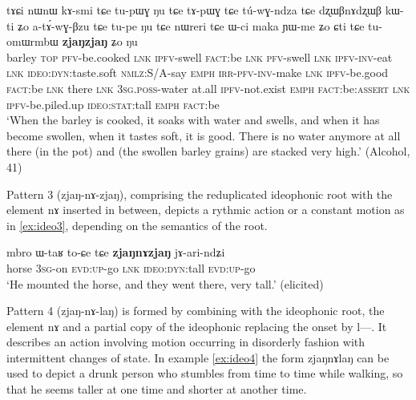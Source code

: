 \documentclass[oldfontcommands,oneside,a4paper,11pt]{article}
\newcommand{\ipa}[1]{{\phon \mbox{#1}}} %
\begin{document}
 
  \begin{exe} 
\ex  \label{ex:zjaNzjaN2}
\gll 
 \ipa{tɤɕi}  	\ipa{nɯnɯ}  	\ipa{kɤ-smi}  	\ipa{tɕe}  	\ipa{tu-pɯɣ}  	\ipa{ŋu}  	\ipa{tɕe}  	\ipa{tɤ-pɯɣ}  	\ipa{tɕe}  	\ipa{tú-wɣ-ndza}  	\ipa{tɕe}  	\ipa{dʐɯβnɤdʐɯβ}  	\ipa{kɯ-ti}  	\ipa{ʑo}  	\ipa{a-tɤ́-wɣ-βzu}  	\ipa{tɕe}  	\ipa{tu-pe}  	\ipa{ŋu}  	\ipa{tɕe}  	\ipa{nɯreri}  	\ipa{tɕe}  	\ipa{ɯ-ci}  	\ipa{maka}  	\ipa{ɲɯ-me}  	\ipa{ʑo}  	\ipa{ɕti}  	\ipa{tɕe}  	\ipa{tu-omɯrmbɯ}  	\ipa{\textbf{zjaŋzjaŋ}}  	\ipa{ʑo}  	\ipa{ŋu}  \\
 barley \textsc{top} \textsc{pfv}-be.cooked \textsc{lnk} \textsc{ipfv}-swell \textsc{fact}:be \textsc{lnk} \textsc{pfv}-swell \textsc{lnk} \textsc{ipfv-inv}-eat \textsc{lnk} \textsc{ideo:dyn}:taste.soft \textsc{nmlz}:S/A-say \textsc{emph} \textsc{irr-pfv-inv}-make \textsc{lnk} \textsc{ipfv}-be.good \textsc{fact}:be \textsc{lnk} there \textsc{lnk} \textsc{3sg.poss}-water at.all \textsc{ipfv}-not.exist  \textsc{emph} \textsc{fact}:be:\textsc{assert} \textsc{lnk} \textsc{ipfv}-be.piled.up \textsc{ideo:stat}:tall \textsc{emph} \textsc{fact}:be  \\
 \glt `When the barley is cooked, it soaks with water and swells, and when it has become swollen, when it tastes soft, it is good. There is no water anymore at all there (in the pot) and (the swollen barley grains) are stacked very high.'  (Alcohol, 41)
 \end{exe}
 
 
 Pattern 3 (\ipa{zjaŋ-nɤ-zjaŋ}), comprising the reduplicated ideophonic root with the element \ipa{nɤ} inserted in between, depicts a rythmic action  or a constant motion as in \ref{ex:ideo3}, depending on the semantics of the root.
 
 
 \begin{exe} 
\ex  \label{ex:ideo3}
\gll 
\ipa{mbro}  	\ipa{ɯ-taʁ}  		\ipa{to-ɕe} \ipa{tɕe}   \ipa{\textbf{zjaŋnɤzjaŋ}}  	\ipa{jɤ-ari-ndʑi}  
  \\
horse \textsc{3sg}-on  \textsc{evd:up}-go \textsc{lnk} \textsc{ideo:dyn}:tall  \textsc{evd:up}-go \\
\glt `He mounted the horse, and  they went there, very tall.'  (elicited)
 \end{exe} 
 
Pattern 4 (\ipa{zjaŋ-nɤ-laŋ}) is formed by combining with the ideophonic root, the element \ipa{nɤ} and a partial copy of the ideophonic replacing the onset by \ipa{l---}. It describes an action involving motion  occurring in disorderly fashion with intermittent changes of state. In example \ref{ex:ideo4} the form  \ipa{zjaŋnɤlaŋ} can be used to depict a drunk person who stumbles from time to time while walking, so that he seems taller at one time and shorter at another time.
 
\end{document}
